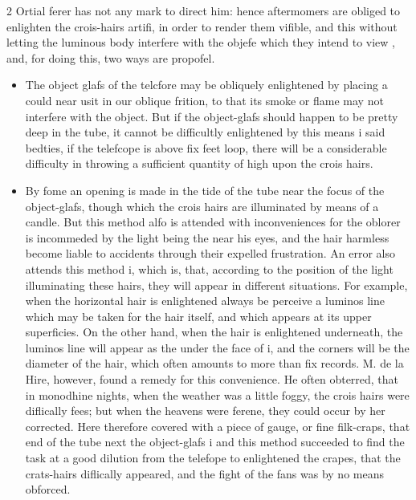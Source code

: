 \documentclass[10pt]{article}
\begin{document}
\begin{multicols}{2}\raggedcolumns
Ortial ferer has not any mark to direct him: hence aftermomers are obliged to enlighten the crois-hairs artifi, in order to render them vifible, and this without letting the luminous body interfere with the objefe which they intend to view , and, for doing this, two ways are propofel.

\begin{itemize}\setlength{\itemsep}{1pt}
\item The object glafs of the telcfore may be obliquely enlightened by placing a could near usit in our oblique frition, to that its smoke or flame may not interfere with the object. But if the object-glafs should happen to be pretty deep in the tube, it cannot be difficultly enlightened by this means i said bedties, if the telefcope is above fix feet loop, there will be a considerable difficulty in throwing a sufficient quantity of high upon the crois hairs.
\item By fome an opening is made in the tide of the tube near the focus of the object-glafs, though which the crois hairs are illuminated by means of a candle. But this method alfo is attended with inconveniences for the oblorer is incommeded by the light being the near his eyes, and the hair harmless become liable to accidents through their expelled frustration. An error also attends this method i, which is, that, according to the position of the light illuminating these hairs, they will appear in different situations. For example, when the horizontal hair is enlightened always be perceive a luminos line which may be taken for the hair itself, and which appears at its upper superficies. On the other hand, when the hair is enlightened underneath, the luminos line will appear as the under the face of i, and the corners will be the diameter of the hair, which often amounts to more than fix records. M. de la Hire, however, found a remedy for this convenience. He often obterred, that in monodhine nights, when the weather was a little foggy, the crois hairs were diflically fees; but when the heavens were ferene, they could occur by her corrected. Here therefore covered with a piece of gauge, or fine filk-craps, that end of the tube next the object-glafs i and this method succeeded to find the task at a good dilution from the telefope to enlightened the crapes, that the crats-hairs diflically appeared, and the fight of the fans was by no means obforced.

\end{itemize}
\end{multicols}
\end{document}
